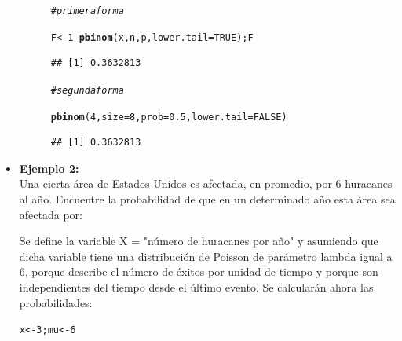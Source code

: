 \documentclass[12pt,letterpaper]{article}\usepackage[]{graphicx}\usepackage[]{color}
\makeatletter
\newcommand{\hlnum}[1]{\textcolor[rgb]{0.686,0.059,0.569}{#1}}%
\newcommand{\hlcom}[1]{\textcolor[rgb]{0.678,0.584,0.686}{\textit{#1}}}%
\newcommand{\hlopt}[1]{\textcolor[rgb]{0,0,0}{#1}}%
\newcommand{\hlstd}[1]{\textcolor[rgb]{0.345,0.345,0.345}{#1}}%
\newcommand{\hlkwb}[1]{\textcolor[rgb]{0.69,0.353,0.396}{#1}}%
\newcommand{\hlkwc}[1]{\textcolor[rgb]{0.333,0.667,0.333}{#1}}%
\newcommand{\hlkwd}[1]{\textcolor[rgb]{0.737,0.353,0.396}{\textbf{#1}}}%
\newenvironment{kframe}{%
 \def\at@end@of@kframe{}%
 \ifinner\ifhmode%
  \def\at@end@of@kframe{\end{minipage}}%
  \begin{minipage}{\columnwidth}%
 \fi\fi%
 \def\FrameCommand##1{\hskip\@totalleftmargin \hskip-\fboxsep
 \colorbox{shadecolor}{##1}\hskip-\fboxsep
     \hskip-\linewidth \hskip-\@totalleftmargin \hskip\columnwidth}%
 \MakeFramed {\advance\hsize-\width
   \@totalleftmargin\z@ \linewidth\hsize
   \@setminipage}}%
 {\par\unskip\endMakeFramed%
 \at@end@of@kframe}
\newenvironment{knitrout}{}{} %
\makeatother
\begin{document}
\begin{itemize}
\begin{description}
\begin{knitrout}
\begin{kframe}
\begin{alltt}
\hlcom{#primera forma}

\hlstd{F} \hlkwb{<-} \hlnum{1} \hlopt{-} \hlkwd{pbinom}\hlstd{(x, n, p,} \hlkwc{lower.tail}\hlstd{=}\hlnum{TRUE}\hlstd{); F}
\end{alltt}
\begin{verbatim}
## [1] 0.3632813
\end{verbatim}
\end{kframe}
\end{knitrout}
\begin{knitrout}
\color{fgcolor}\begin{kframe}
\begin{alltt}
\hlcom{#segunda forma}

\hlkwd{pbinom}\hlstd{(}\hlnum{4}\hlstd{,} \hlkwc{size}\hlstd{=}\hlnum{8}\hlstd{,} \hlkwc{prob}\hlstd{=}\hlnum{0.5}\hlstd{,} \hlkwc{lower.tail}\hlstd{=}\hlnum{FALSE}\hlstd{)}
\end{alltt}
\begin{verbatim}
## [1] 0.3632813
\end{verbatim}
\end{kframe}
\end{knitrout}
\end{description}

\item \textbf{Ejemplo 2:}\\

Una cierta \'area de Estados Unidos es afectada, en promedio, por 6 huracanes al a\~no. Encuentre la probabilidad de que en un determinado a\~no esta \'area sea afectada por:
Se define la variable X = "n\'umero de huracanes por a\~no" y asumiendo que dicha variable tiene una distribuci\'on de Poisson de par\'ametro lambda igual a 6, porque describe el n\'umero de \'exitos por unidad de tiempo y porque son independientes del tiempo desde el \'ultimo evento. Se calcular\'an ahora las probabilidades: 
\begin{knitrout}
\color{fgcolor}\begin{kframe}
\begin{alltt}
\hlstd{x} \hlkwb{<-} \hlnum{3}\hlstd{; mu} \hlkwb{<-} \hlnum{6}


\end{alltt}
\end{kframe}
\end{knitrout}
\end{itemize}
\end{document}
